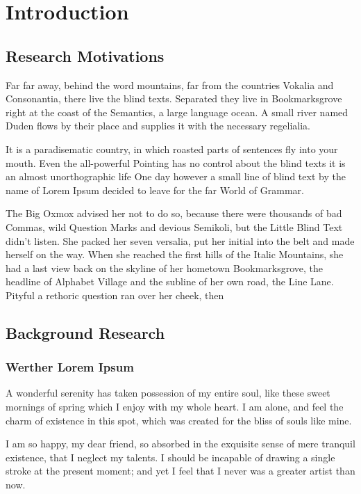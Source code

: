 \chapter{Introduction}

\section{Research Motivations}\label{introduction:research_motivations}

    Far far away, behind the word mountains, far from the countries Vokalia and Consonantia, there live the blind texts. Separated they live in Bookmarksgrove right at the coast of the Semantics, a large language ocean. A small river named Duden flows by their place and supplies it with the necessary regelialia.

    It is a paradisematic country, in which roasted parts of sentences fly into your mouth. Even the all-powerful Pointing has no control about the blind texts it is an almost unorthographic life One day however a small line of blind text by the name of Lorem Ipsum decided to leave for the far World of Grammar.

    The Big Oxmox\cite{yi1999observer} advised her not to do so, because there were thousands of bad Commas, wild Question Marks and devious Semikoli, but the Little Blind Text didn’t listen. She packed her seven versalia, put her initial into the belt and made herself on the way. When she reached the first hills of the Italic Mountains, she had a last view back on the skyline of her hometown Bookmarksgrove, the headline of Alphabet Village and the subline of her own road, the Line Lane. Pityful a rethoric question ran over her cheek, then

\section{Background Research}\label{introduction:background_research}

\subsection{Werther Lorem Ipsum}

    A wonderful serenity has taken possession of my entire soul, like these sweet mornings of spring which I enjoy with my whole heart. I am alone, and feel the charm of existence in this spot, which was created for the bliss of souls like mine.

    I am so happy, my dear friend, so absorbed in the exquisite sense of mere tranquil existence, that I neglect my talents. I should be incapable of drawing a single stroke at the present moment; and yet I feel that I never was a greater artist than now.

